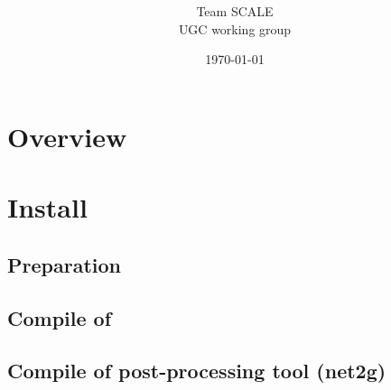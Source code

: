 \documentclass[a4paper]{report}
\title{{\vspace{2cm}{\Large Version \version} }}
\author{\Large Team SCALE\\ UGC working group}
\date{\today}
\begin{document}
\maketitle
\ClearWallPaper
{}
\tableofcontents


\part{Overview} \label{part:overview}

\part{Install} \label{part:install}
 \chapter{Preparation}
 \chapter{Compile of \scalelib}
 \chapter{Compile of post-processing tool (net2g)}
 
\end{document}

